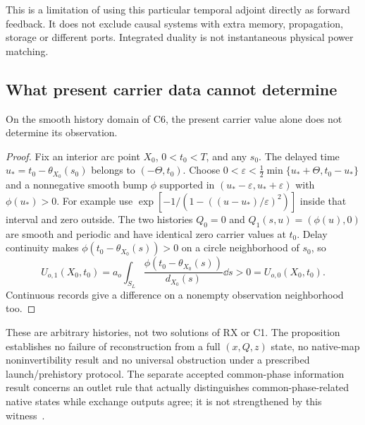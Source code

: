 This is a limitation of using this particular temporal adjoint directly as forward feedback. It does not exclude causal systems with extra memory, propagation, storage or different ports. Integrated duality is not instantaneous physical power matching.

\subsection{What present carrier data cannot determine}
\begin{proposition}\label{prop:presenthistory}
On the smooth history domain of C6, the present carrier value alone does not determine its observation.
\end{proposition}
\begin{proof}
Fix an interior arc point $X_0$, $0<t_0<T$, and any $s_0$. The delayed time
$u_*=t_0-\theta_{X_0}(s_0)$ belongs to $(-\Theta,t_0)$. Choose
$0<\varepsilon<\frac12\min\{u_*+\Theta,t_0-u_*\}$ and a nonnegative smooth bump $\phi$ supported in $(u_*-\varepsilon,u_*+\varepsilon)$ with $\phi(u_*)>0$. For example use $\exp[-1/(1-((u-u_*)/\varepsilon)^2)]$ inside that interval and zero outside. The two histories $Q_0=0$ and $Q_1(s,u)=(\phi(u),0)$ are smooth and periodic and have identical zero carrier values at $t_0$. Delay continuity makes $\phi(t_0-\theta_{X_0}(s))>0$ on a circle neighborhood of $s_0$, so
\begin{equation}\label{eq:historywitness}
U_{o,1}(X_0,t_0)=a_o\int_{S_L}\frac{\phi(t_0-\theta_{X_0}(s))}{d_{X_0}(s)}\dd s>0=U_{o,0}(X_0,t_0).
\end{equation}
Continuous records give a difference on a nonempty observation neighborhood too.
\end{proof}

These are arbitrary histories, not two solutions of RX or C1. The proposition establishes no failure of reconstruction from a full $(x,Q,z)$ state, no native-map noninvertibility result and no universal obstruction under a prescribed launch/prehistory protocol. The separate accepted common-phase information result concerns an outlet rule that actually distinguishes common-phase-related native states while exchange outputs agree; it is not strengthened by this witness~\cite{centralpaper,Wreview}.

